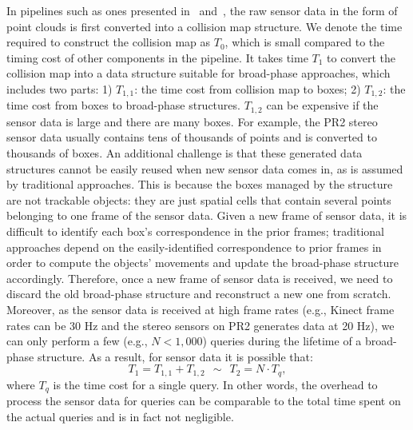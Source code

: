 In pipelines such as ones presented in~\cite{Rusu:RPG:2009}
and~\cite{Ioan:2010}, the raw sensor data in the form of point
clouds is first converted into a collision map structure.
We denote the time required to construct the collision map as $T_0$,
which is small compared to the timing cost of other components in the
pipeline. It takes time $T_1$ to convert the collision map into a data
structure suitable for broad-phase approaches, which includes two
parts: 1) $T_{1,1}$: the time cost from collision map to boxes; 2)
$T_{1,2}$: the time cost from boxes to broad-phase
structures. $T_{1,2}$ can be expensive if the sensor data is large and
there are many boxes. For example, the PR2 stereo sensor data usually
contains tens of thousands of points and is converted to thousands of
boxes. An additional challenge is that these generated data structures
cannot be easily reused when new sensor data comes in, as is
assumed by traditional approaches.
This is because the boxes
managed by the structure are not trackable objects: they are just
spatial cells that contain several points belonging to one frame of
the sensor data. Given a new frame of sensor data, it is difficult to
identify each box's correspondence in the prior frames; traditional approaches depend on the easily-identified correspondence to prior frames in order to compute the objects' movements and update the broad-phase structure accordingly. Therefore, once a
new frame of sensor data is received, we need to discard the old broad-phase structure and reconstruct a new one from scratch. Moreover, as
the sensor data is received at high frame rates (e.g., Kinect\texttrademark{} frame
rates can be 30 Hz and the stereo sensors on PR2 generates data at 20
Hz), we can only perform a few
(e.g., $N < 1,000$) queries during the lifetime of a broad-phase
structure. As a result, for sensor data it is possible that:
\begin{equation}
T_1 = T_{1,1} + T_{1,2} \ \ \sim \ \ T_2 = N \cdot T_q,
\end{equation}
where $T_q$ is the time cost for a single query. In other words, the overhead to process the sensor data for queries can be comparable to the total time spent on the actual queries and is in fact not negligible.

